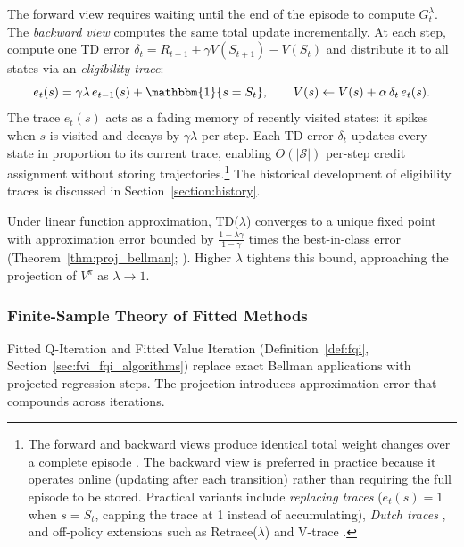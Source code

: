 The forward view requires waiting until the end of the episode to compute $G_t^\lambda$. The \emph{backward view} computes the same total update incrementally. At each step, compute one TD error $\delta_t = R_{t+1} + \gamma V(S_{t+1}) - V(S_t)$ and distribute it to all states via an \emph{eligibility trace}:
\begin{equation}
e_t(s) = \gamma\lambda\, e_{t-1}(s) + \mathbbm{1}\{s = S_t\}, \qquad V(s) \leftarrow V(s) + \alpha\,\delta_t\,e_t(s).
\label{eq:eligibility_trace}
\end{equation}
The trace $e_t(s)$ acts as a fading memory of recently visited states: it spikes when $s$ is visited and decays by $\gamma\lambda$ per step. Each TD error $\delta_t$ updates every state in proportion to its current trace, enabling $O(|\mathcal{S}|)$ per-step credit assignment without storing trajectories.\footnote{The forward and backward views produce identical total weight changes over a complete episode \citep{sutton1988}. The backward view is preferred in practice because it operates online (updating after each transition) rather than requiring the full episode to be stored. Practical variants include \emph{replacing traces} ($e_t(s) = 1$ when $s = S_t$, capping the trace at 1 instead of accumulating), \emph{Dutch traces} \citep{vanseijen2016}, and off-policy extensions such as Retrace($\lambda$) \citep{munos2016retrace} and V-trace \citep{espeholt2018impala}.} The historical development of eligibility traces is discussed in Section~\ref{section:history}.

Under linear function approximation, TD($\lambda$) converges to a unique fixed point with approximation error bounded by $\frac{1-\lambda\gamma}{1-\gamma}$ times the best-in-class error (Theorem~\ref{thm:proj_bellman}; \citealp{tsitsiklis1997}). Higher $\lambda$ tightens this bound, approaching the projection of $V^\pi$ as $\lambda \to 1$.

\subsubsection{Finite-Sample Theory of Fitted Methods}
\label{sec:fvi_fqi_theory}

Fitted Q-Iteration and Fitted Value Iteration (Definition~\ref{def:fqi}, Section~\ref{sec:fvi_fqi_algorithms}) replace exact Bellman applications with projected regression steps. The projection introduces approximation error that compounds across iterations.

